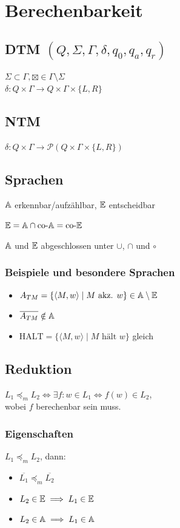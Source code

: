 \section*{Berechenbarkeit}

\subsection*{DTM $(Q,\Sigma,\Gamma,\delta,q_0,q_a,q_r)$}
$\Sigma \subset \Gamma, \boxtimes \in \Gamma \setminus \Sigma$\\
$\delta : Q \times \Gamma \to Q \times \Gamma \times \{L, R\}$

\subsection*{NTM}
$\delta : Q \times \Gamma \to \mathcal{P}(Q \times \Gamma \times \{L, R\})$

\subsection*{Sprachen}
$\mathbb{A}$ erkennbar/aufzählbar, $\mathbb{E}$ entscheidbar

$\mathbb{E} = \mathbb{A} \cap \text{co-$\mathbb{A}$}=\text{co-$\mathbb{E}$}$

$\mathbb{A}$ und $\mathbb{E}$ abgeschlossen unter $\cup$, $\cap$ und $\circ$

\subsubsection*{Beispiele und besondere Sprachen}
\begin{itemize}
	\item $A_{TM}=\{\langle M,w \rangle \mid\text{$M$ akz. $w$}\} \in \mathbb{A} \setminus \mathbb{E}$
	\item $\overline{A_{TM}} \notin \mathbb{A}$
	\item $\text{HALT}=\{\langle M,w \rangle \mid \text{$M$ hält $w$}\}$ gleich
\end{itemize}

\subsection*{Reduktion}
$L_1 \preceq_m L_2 \iff \exists f: w\in L_1 \Leftrightarrow f(w) \in L_2$,\\
wobei $f$ berechenbar sein muss.

\subsubsection*{Eigenschaften}
$L_1 \preceq_m L_2$, dann:
\begin{itemize}
	\item $\overline{L_1} \preceq_m \overline{L_2}$
	\item $L_2 \in \mathbb{E} \implies L_1 \in \mathbb{E}$
	\item $L_2 \in \mathbb{A} \implies L_1 \in \mathbb{A}$
\end{itemize}

